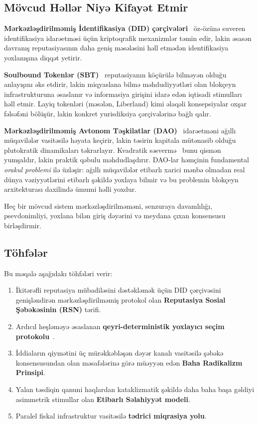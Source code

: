 \documentclass[11pt,a4paper,twocolumn]{article}
\begin{document}
\subsection{Mövcud Həllər Niyə Kifayət Etmir}

\textbf{Mərkəzləşdirilməmiş İdentifikasiya (DID) çərçivələri}~\cite{did2022} öz-özünə suveren identifikasiya idarəetməsi üçün kriptoqrafik mexanizmlər təmin edir, lakin əsasən davranış reputasiyasının daha geniş məsələsini həll etmədən identifikasiya yoxlanışına diqqət yetirir.

\textbf{Soulbound Tokenlər (SBT)}~\cite{weyl2022} reputasiyanın köçürülə bilməyən olduğu anlayışını əks etdirir, lakin miqyaslana bilmə məhdudiyyətləri olan blokçeyn infrastrukturuna əsaslanır və informasiya girişini idarə edən iqtisadi stimulları həll etmir. Layiq tokenləri (məsələn, Liberland) kimi əlaqəli konsepsiyalar oxşar fəlsəfəni bölüşür, lakin konkret yurisdiksiya çərçivələrinə bağlı qalır.

\textbf{Mərkəzləşdirilməmiş Avtonom Təşkilatlar (DAO)}~\cite{buterin2014} idarəetməni ağıllı müqavilələr vasitəsilə həyata keçirir, lakin təsirin kapitala mütənasib olduğu plutokratik dinamikaları təkrarlayır. Kvadratik səsvermə~\cite{buterin2019} bunu qismən yumşaldır, lakin praktik qəbulu məhdudlaşdırır. DAO-lar həmçinin fundamental \emph{orakul problemi} ilə üzləşir: ağıllı müqavilələr etibarlı xarici mənbə olmadan real dünya vəziyyətlərini etibarlı şəkildə yoxlaya bilmir və bu problemin blokçeyn arxitekturası daxilində ümumi həlli yoxdur.

Heç bir mövcud sistem mərkəzləşdirilməməni, senzuraya davamlılığı, psevdonimliyi, yoxlana bilən giriş dəyərini və meydana çıxan konsensusu birləşdirmir.

\subsection{Töhfələr}

Bu məqalə aşağıdakı töhfələri verir:
\begin{enumerate}[nosep]
\item İkitərəfli reputasiya mübadiləsini dəstəkləmək üçün DID çərçivəsini genişləndirən mərkəzləşdirilməmiş protokol olan \textbf{Reputasiya Sosial Şəbəkəsinin (RSN)} tərifi.
\item Ardıcıl heşləməyə əsaslanan \textbf{qeyri-deterministik yoxlayıcı seçim protokolu}~\cite{karger1997}.
\item İddiaların qiymətini üç mürəkkəbləşən dəyər kanalı vasitəsilə şəbəkə konsensusundan olan məsafələrinə görə müəyyən edən \textbf{Baha Radikalizm Prinsipi}.
\item Yalan təsdiqin qanuni haqlardan kataklizmatik şəkildə daha baha başa gəldiyi asimmetrik stimullar olan \textbf{Etibarlı Səlahiyyət modeli}.
\item Paralel fiskal infrastruktur vasitəsilə \textbf{tədrici miqrasiya yolu}.
\end{enumerate}
\end{document}
